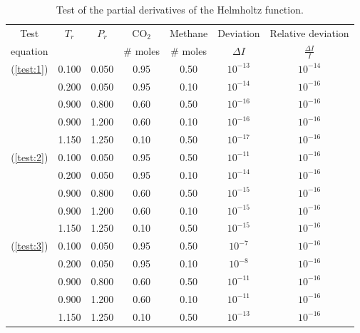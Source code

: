 \documentclass[internal,english]{sintefmemo2012}
\numberwithin{equation}{section}
\newcommand*{\reff}[1]{(\ref{#1})}
\begin{document}
\begin{table}[h!]
  \centering
    \caption{Test of the partial derivatives of the Helmholtz function.}
    \label{tab:testHelmholtz}
    \begin{tabular}{c c c c c c c}
      \hline
      Test 			& $T_r$ & $P_r$ & CO$_2$	& Methane	& Deviation 		& Relative deviation \\
      equation		&		&		& \# moles	& \# moles	& $\Delta I$		& $\frac{\Delta I}{I}$\\
      \hline
      \reff{test:1}	& 0.100	& 0.050	& 0.95		&0.50		& $10^{-13}$ 	& $10^{-14}$	\\
      				& 0.200	& 0.050	& 0.95		&0.10		& $10^{-14}$	& $10^{-16}$	\\
      				& 0.900	& 0.800	& 0.60		&0.50		& $10^{-16}$	& $10^{-16}$	\\
      				& 0.900	& 1.200	& 0.60		&0.10		& $10^{-16}$	& $10^{-16}$	\\
      				& 1.150	& 1.250	& 0.10		&0.50		& $10^{-17}$	& $10^{-16}$	\\
      \reff{test:2}	& 0.100	& 0.050	& 0.95		&0.50		& $10^{-11}$	& $10^{-16}$	\\
      				& 0.200	& 0.050	& 0.95		&0.10		& $10^{-14}$	& $10^{-16}$	\\
      				& 0.900	& 0.800	& 0.60		&0.50		& $10^{-15}$	& $10^{-16}$	\\
      				& 0.900	& 1.200	& 0.60		&0.10		& $10^{-15}$	& $10^{-16}$	\\
      				& 1.150	& 1.250	& 0.10		&0.50		& $10^{-15}$	& $10^{-16}$	\\
      \reff{test:3}	& 0.100	& 0.050	& 0.95		&0.50		& $10^{-7}$		& $10^{-16}$	\\
      				& 0.200	& 0.050	& 0.95		&0.10		& $10^{-8}$		& $10^{-16}$	\\
      				& 0.900	& 0.800	& 0.60		&0.50		& $10^{-11}$	& $10^{-16}$	\\
      				& 0.900	& 1.200	& 0.60		&0.10		& $10^{-11}$	& $10^{-16}$	\\
      				& 1.150	& 1.250	& 0.10		&0.50		& $10^{-13}$	& $10^{-16}$	\\
      \hline
    \end{tabular}
\end{table}
\end{document}
